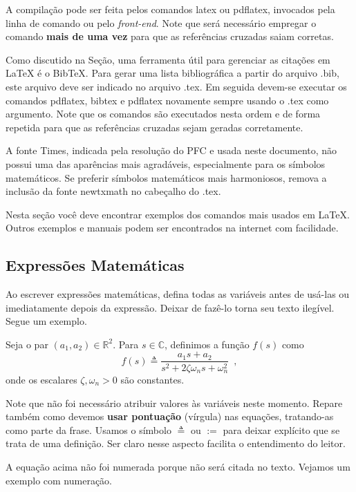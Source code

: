 A compilação pode ser feita pelos comandos \textsf{latex} ou \textsf{pdflatex}, invocados pela linha de comando ou pelo \emph{front-end}. Note que será necessário empregar o comando \textbf{mais de uma vez} para que as referências cruzadas saiam corretas.

Como discutido na Seção, uma ferramenta útil para gerenciar as citações em {\LaTeX} é o Bib\TeX. Para gerar uma lista bibliográfica a partir do arquivo .bib, este arquivo deve ser indicado no arquivo .tex. Em seguida devem-se executar os comandos \textsf{pdflatex}, \textsf{bibtex} e \textsf{pdflatex} novamente sempre usando o .tex como argumento. Note que os comandos são executados nesta ordem e de forma repetida para que as referências cruzadas sejam geradas corretamente.

A fonte \textsf{Times}, indicada pela resolução do PFC e usada neste documento, não possui uma das aparências mais agradáveis, especialmente para os símbolos matemáticos. Se preferir símbolos matemáticos mais harmoniosos, remova a inclusão da fonte \textsf{newtxmath} no cabeçalho do .tex.

Nesta seção você deve encontrar exemplos dos comandos mais usados em \LaTeX. Outros exemplos e manuais podem ser encontrados na internet com facilidade.

\subsection{Expressões Matemáticas}

Ao escrever expressões matemáticas, defina todas as variáveis antes de usá-las ou imediatamente depois da expressão. Deixar de fazê-lo torna seu texto ilegível. Segue um exemplo.

Seja o par $(a_1,a_2)\in \mathbb{R}^2$. Para $s\in\mathbb{C}$, definimos a função $f(s)$ como
\[%
f(s)\triangleq \frac{a_1 s+a_2}{s^2+2\zeta\omega_n s+\omega_n^2}
\enspace,
\]
onde os escalares $\zeta,\omega_n>0$ são constantes.

Note que não foi necessário atribuir valores às variáveis neste momento. Repare também como devemos \textbf{usar pontuação} (vírgula) nas equações, tratando-as como parte da frase. Usamos o símbolo $\triangleq$ ou $:=$ para deixar explícito que se trata de uma definição. Ser claro nesse aspecto facilita o entendimento do leitor.

A equação acima não foi numerada porque não será citada no texto. Vejamos um exemplo com numeração.

